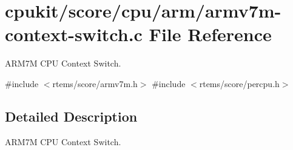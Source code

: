 \hypertarget{armv7m-context-switch_8c}{}\section{cpukit/score/cpu/arm/armv7m-\/context-\/switch.c File Reference}
\label{armv7m-context-switch_8c}


A\+R\+M7M C\+PU Context Switch.  


{\ttfamily \#include $<$rtems/score/armv7m.\+h$>$}\newline
{\ttfamily \#include $<$rtems/score/percpu.\+h$>$}\newline


\subsection{Detailed Description}
A\+R\+M7M C\+PU Context Switch. 

